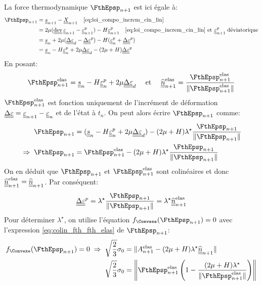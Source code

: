 \documentclass[10pt]{book}
\begin{document}
\begin{appendices}
\begin{Demo}
{La force thermodynamique $\FthEpsp_{n+1}$ est ici égale à:
$$\begin{aligned}
\FthEpsp_{n+1}&=\devia_{n+1}-\CentreConv_{n+1} \quad \eqref{eq:loi_compo_increm_cin_lin}\\
&=2\mu(\dev\DefoHPP_{n+1}-\EpsP_{n+1})-H\EpsP_{n+1} \quad \eqref{eq:loi_compo_increm_cin_lin}\et \EpsP_{n+1} \; \text{déviatorique}\\
&=\devia_{n}+2\mu(\DeltaDefoHPP_{d}-\DeltaEpsP)-H(\EpsP_{n}+\DeltaEpsP) \\
&=\devia_{n}-H\DefoHPP_{n}^{p}+2\mu\DeltaDefoHPP_{d}-(2\mu+H)\DeltaEpsP
\end{aligned}$$
En posant:
\begin{equation*}
\FthEpsp_{n+1}^{\text{elas}}=\devia_{n}-H\DefoHPP_{n}^{p}+2\mu\DeltaDefoHPP_{d} \quad \et \quad \hat{\ten{n}}_{n+1}^{\text{elas}}=\frac{\FthEpsp_{n+1}^{\text{elas}}}{\Vert\FthEpsp_{n+1}^{\text{elas}}\Vert}
\end{equation*}
$\FthEpsp_{n+1}^{\text{elas}}$ est fonction uniquement de l'incrément de déformation $\DeltaDefoHPP=\DefoHPP_{n+1}-\DefoHPP_{n}$ et de l'état à $t_{n}$. On peut alors écrire $\FthEpsp_{n+1}$ comme:
\begin{align}
\FthEpsp_{n+1}&=(\devia_{n}-H\DefoHPP^{p}_{n}+2\mu\DeltaDefoHPP_{d})-(2\mu+H)\lambda^{\star}\frac{\FthEpsp_{n+1}}{\Vert\FthEpsp_{n+1}\Vert}\\\label{eq:colin_fth_fth_elas}
\implique \FthEpsp_{n+1} &= \FthEpsp_{n+1}^{\text{elas}}-(2\mu+H)\lambda^{\star}\frac{\FthEpsp_{n+1}}{\Vert\FthEpsp_{n+1}\Vert}
\end{align}
On en déduit que $\FthEpsp_{n+1}$ et $\FthEpsp_{n+1}^{\text{elas}}$ sont colinéaires et donc $\hat{\ten{n}}_{n+1}^{\text{elas}}=\hat{\ten{n}}_{n+1}$. Par conséquent:
\begin{equation}
\DeltaEpsP=\lambda^{\star}\frac{\FthEpsp_{n+1}}{\Vert\FthEpsp_{n+1}\Vert}=\lambda^{\star}\hat{\ten{n}}^{\text{elas}}_{n+1}
\label{eq:6_80}
\end{equation}
Pour déterminer $\lambda^{\star}$, on utilise l'équation $\FChargeConvexe(\FthEpsp_{n+1})=0$ avec l'expression \eqref{eq:colin_fth_fth_elas} de $\FthEpsp_{n+1}$:
$$\begin{aligned}
\FChargeConvexe(\FthEpsp_{n+1})=0\implique \sqrt{\frac{2}{3}}\sigma_{0} &= \Vert A_{n+1}^{\text{elas}}-(2\mu+H)\lambda^{\star}\hat{\ten{n}}_{n+1}\Vert\\
\sqrt{\frac{2}{3}}\sigma_{0}&=\left\Vert\FthEpsp_{n+1}^{\text{elas}}\left(1-\frac{(2\mu+H)\lambda^{\star}}{\Vert\FthEpsp_{n+1}^{\text{elas}}\Vert}\right)\right\Vert\\

\end{aligned}$$}
\end{Demo}
\end{appendices}
\end{document}
